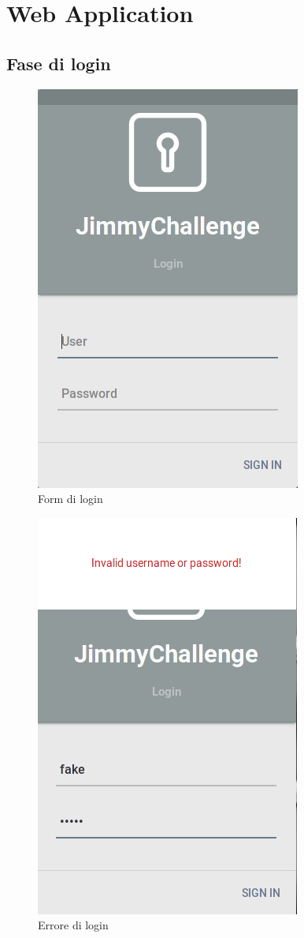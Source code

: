\clearpage
\section{Web Application}
\subsection{Fase di login}

\begin{figure}[!ht]
	\centering
	\includegraphics[scale=.4]{img/testing/login.png}
	\caption{Form di login}
\end{figure}

\begin{figure}[!ht]
	\centering
	\includegraphics[scale=.4]{img/testing/login_error.png}
	\caption{Errore di login}
\end{figure}

